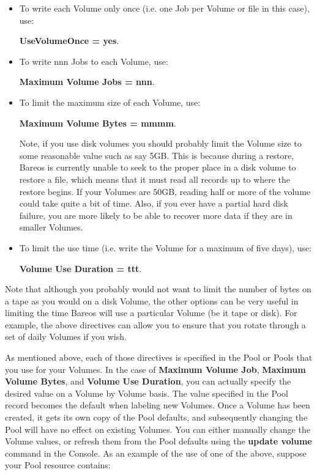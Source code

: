 \begin{itemize}
\item To write each Volume only once (i.e. one Job per Volume or file  in this
   case), use:

{\bf UseVolumeOnce = yes}.

\item To write nnn Jobs to each Volume, use:

   {\bf Maximum Volume Jobs = nnn}.

\item To limit the maximum size of each Volume, use:

   {\bf Maximum Volume Bytes = mmmm}.

   Note, if you use disk volumes you should probably limit the Volume size to some reasonable
   value such as say 5GB. This is because during a restore, Bareos is
   currently unable to seek to the proper place in a disk volume to restore
   a file, which means that it must read all records up to where the
   restore begins. If your Volumes are 50GB, reading half or more of the
   volume could take quite a bit of time.  Also, if you ever have a partial
   hard disk failure, you are more likely to be able to recover more data
   if they are in smaller Volumes.

\item To limit the use time (i.e. write the Volume for a maximum of five days),
   use:

{\bf Volume Use Duration = ttt}.
\end{itemize}

Note that although you probably would not want to limit the number of bytes on
a tape as you would on a disk Volume, the other options can be very useful in
limiting the time Bareos will use a particular Volume (be it tape or disk).
For example, the above directives can allow you to ensure that you rotate
through a set of daily Volumes if you wish.

As mentioned above, each of those directives is specified in the Pool or
Pools that you use for your Volumes. In the case of {\bf Maximum Volume Job},
{\bf Maximum Volume Bytes}, and {\bf Volume Use Duration}, you can actually
specify the desired value on a Volume by Volume basis. The value specified in
the Pool record becomes the default when labeling new Volumes. Once a Volume
has been created, it gets its own copy of the Pool defaults, and subsequently
changing the Pool will have no effect on existing Volumes. You can either
manually change the Volume values, or refresh them from the Pool defaults using
the {\bf update volume} command in the Console. As an example
of the use of one of the above, suppose your Pool resource contains:

